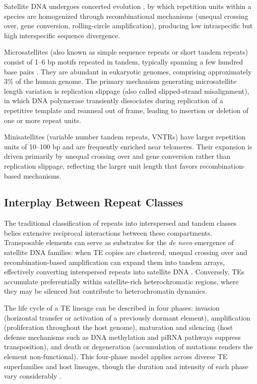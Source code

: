 Satellite DNA undergoes concerted evolution \parencite{dover1982}, by which repetition units within a species are homogenized through recombinational mechanisms (unequal crossing over, gene conversion, rolling-circle amplification), producing low intraspecific but high interspecific sequence divergence.

Microsatellites (also known as simple sequence repeats or short tandem repeats) consist of 1--6 bp motifs repeated in tandem, typically spanning a few hundred base pairs \parencite{ellegren2004}. They are abundant in eukaryotic genomes, comprising approximately 3\% of the human genome. The primary mechanism generating microsatellite length variation is replication slippage (also called slipped-strand misalignment), in which DNA polymerase transiently dissociates during replication of a repetitive template and reanneal out of frame, leading to insertion or deletion of one or more repeat units.

Minisatellites (variable number tandem repeats, VNTRs) have larger repetition units of 10--100 bp and are frequently enriched near telomeres. Their expansion is driven primarily by unequal crossing over and gene conversion rather than replication slippage, reflecting the larger unit length that favors recombination-based mechanisms.

\subsection{Interplay Between Repeat Classes}

The traditional classification of repeats into interspersed and tandem classes belies extensive reciprocal interactions between these compartments. Transposable elements can serve as substrates for the \textit{de novo} emergence of satellite DNA families: when TE copies are clustered, unequal crossing over and recombination-based amplification can expand them into tandem arrays, effectively converting interspersed repeats into satellite DNA \parencite{mestrovic2015}. Conversely, TEs accumulate preferentially within satellite-rich heterochromatic regions, where they may be silenced but contribute to heterochromatin dynamics.

The life cycle of a TE lineage can be described in four phases: invasion (horizontal transfer or activation of a previously dormant element), amplification (proliferation throughout the host genome), maturation and silencing (host defense mechanisms such as DNA methylation and piRNA pathways suppress transposition), and death or degeneration (accumulation of mutations renders the element non-functional). This four-phase model applies across diverse TE superfamilies and host lineages, though the duration and intensity of each phase vary considerably \parencite{kidwell2002}.

